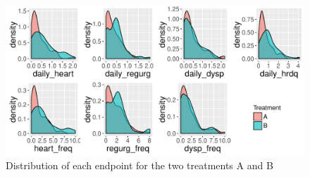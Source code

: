 \documentclass[12pt]{article}
\begin{document}
\begin{figure}
\centering
\includegraphics[width = \textwidth]{fig/clinical_distr.pdf}
\caption{Distribution of each endpoint for the two treatments A and B}
\label{fig:clinical_distr}
\end{figure}

%
%
\end{document}
